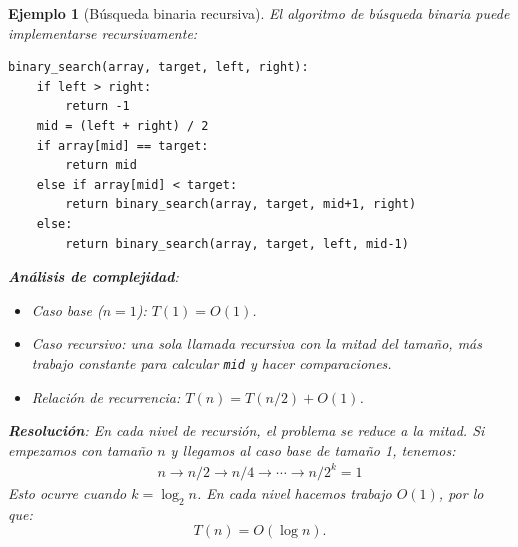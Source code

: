 \documentclass[a4paper,11pt]{report}
\newtheorem{example}[theorem]{Ejemplo}
\begin{document}
\begin{example}[Búsqueda binaria recursiva]
El algoritmo de búsqueda binaria puede implementarse recursivamente:
\begin{verbatim}
binary_search(array, target, left, right):
    if left > right:
        return -1
    mid = (left + right) / 2
    if array[mid] == target:
        return mid
    else if array[mid] < target:
        return binary_search(array, target, mid+1, right)
    else:
        return binary_search(array, target, left, mid-1)
\end{verbatim}

\textbf{Análisis de complejidad}:
\begin{itemize}
\item Caso base ($n = 1$): $T(1) = O(1)$.
\item Caso recursivo: una sola llamada recursiva con la mitad del tamaño, más trabajo constante para calcular \texttt{mid} y hacer comparaciones.
\item Relación de recurrencia: $T(n) = T(n/2) + O(1)$.
\end{itemize}

\textbf{Resolución}: En cada nivel de recursión, el problema se reduce a la mitad. Si empezamos con tamaño $n$ y llegamos al caso base de tamaño 1, tenemos:
\begin{align*}
n \to n/2 \to n/4 \to \cdots \to n/2^k = 1
\end{align*}
Esto ocurre cuando $k = \log_2 n$. En cada nivel hacemos trabajo $O(1)$, por lo que:
\[
T(n) = O(\log n).
\]
\end{example}
\end{document}
